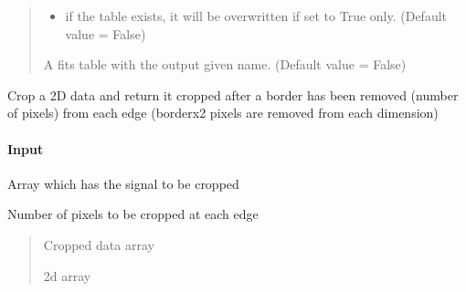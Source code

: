 \documentclass[letterpaper,10pt,english]{sphinxmanual}
\begin{document}
\begin{fulllineitems}
\begin{quote}
\begin{description}
\begin{itemize}
\item {} 
\sphinxAtStartPar
{} \textendash{} if the table exists, it will be overwritten if set
to True only. (Default value = False)

\end{itemize}

\sphinxAtStartPar
A fits table with the output given name. (Default value = False)

\end{description}\end{quote}

\end{fulllineitems}


\begin{fulllineitems}
\label{\detokenize{api/pymusepipe:pymusepipe.util_image.crop_data}}
\pysigstartsignatures
{}
\pysigstopsignatures
\sphinxAtStartPar
Crop a 2D data and return it cropped after a border
has been removed (number of pixels) from each edge
(borderx2 pixels are removed from each dimension)


\paragraph{Input}
\label{\detokenize{api/pymusepipe:id142}}\begin{description}
\sphinxAtStartPar
Array which has the signal to be cropped

\sphinxAtStartPar
Number of pixels to be cropped at each edge

\end{description}
\begin{quote}\begin{description}
\sphinxAtStartPar
{} \textendash{} Cropped data array

\sphinxAtStartPar
2d array

\end{description}\end{quote}

\end{fulllineitems}
\end{document}
